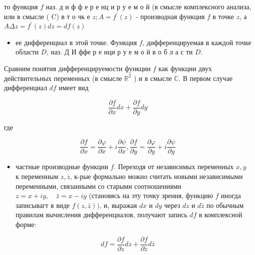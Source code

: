 \documentclass[10pt]{article}
\begin{document}
то функция $f$ наз. д и ф ф е р е нц и р у е м о й (в смысле комплексного анализа, или в смысле ( C) в т о чк е $z ; A=f^{\prime}(z)$ - производная функция $f$ в точке $z$, а $A \Delta z=f^{\prime}(z) d z=d f(z)$



\begin{itemize}

  \item ее дифференциал в этой точке. Функция $f$, дифференцируемая в каждой точке области $D$, наз. Д И ффе р е нци р у е м о й в о б л а с ти $D$.

\end{itemize}



Сравним понятия дифференцируемости функции $f$ как функции двух действительных переменных (в смысле $\mathbb{R}^{2}$ ) и в смысле $\mathbb{C}$. В первом случае дифференциал $d f$ имеет вид



\[

\frac{\partial f}{\partial x} d x+\frac{\partial f}{\partial y} d y

\]



где



\[

\frac{\partial f}{\partial x}=\frac{\partial \varphi}{\partial x}+i \frac{\partial \psi}{\partial x}, \frac{\partial f}{\partial y}=\frac{\partial \varphi}{\partial y}+i \frac{\partial \psi}{\partial y}

\]



\begin{itemize}

  \item частные производные функции $f$. Переходя от независимых переменных $x, y$ к переменным $z, \bar{z}$, к-рые формально можно считать новыми независимыми переменными, связанными со старыми соотношениями $z=x+i y, \quad \bar{z}=x-i y$ (становясь на эту точку зрения, функцию $f$ иногда записывагт в виде $f(z, \bar{z}))$, и, выражая $d x$ и $d y$ через $d z$ и $d \bar{z}$ по обычным правилам вычисления дифференциалов, получают запись $d f$ в комплексной форме:

\end{itemize}



\[

d f=\frac{\partial f}{\partial z} d z+\frac{\partial f}{\partial \bar{z}} d \bar{z}

\]
\end{document}

